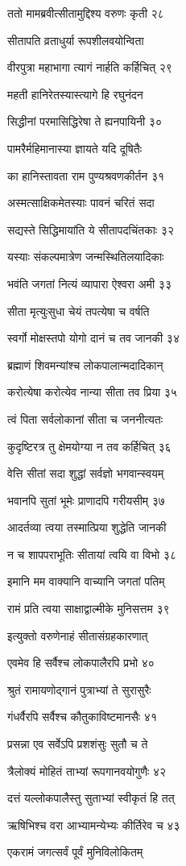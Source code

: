 ततो मामब्रवीत्सीतामुद्दिश्य वरुणः कृती २८

सीतापति व्रताधुर्या रूपशीलवयोन्विता

वीरपुत्रा महाभागा त्यागं नार्हति कर्हिचित् २९

महती हानिरेतस्यास्त्यागे हि रघुनंदन

सिद्धीनां परमासिद्धिरेषा ते ह्यनपायिनी ३०

पामरैर्महिमानास्या ज्ञायते यदि दूषितैः

का हानिस्तावता राम पुण्यश्रवणकीर्तन ३१

अस्मत्साक्षिकमेतस्याः पावनं चरितं सदा

सद्यस्ते सिद्धिमायांति ये सीतापदचिंतकाः ३२

यस्याः संकल्पमात्रेण जन्मस्थितिलयादिकाः

भवंति जगतां नित्यं व्यापारा ऐश्वरा अमी ३३

सीता मृत्युःसुधा चेयं तपत्येषा च वर्षति

स्वर्गो मोक्षस्तपो योगो दानं च तव जानकी ३४

ब्रह्माणं शिवमन्यांश्च लोकपालान्मदादिकान्

करोत्येषा करोत्येव नान्या सीता तव प्रिया ३५

त्वं पिता सर्वलोकानां सीता च जननीत्यतः

कुदृष्टिरत्र तु क्षेमयोग्या न तव कर्हिचित् ३६

वेत्ति सीतां सदा शुद्धां सर्वज्ञो भगवान्स्वयम्

भवानपि सुतां भूमेः प्राणादपि गरीयसीम् ३७

आदर्तव्या त्वया तस्मात्प्रिया शुद्धेति जानकी

न च शापपराभूतिः सीतायां त्वयि वा विभो ३८

इमानि मम वाक्यानि वाच्यानि जगतां पतिम्

रामं प्रति त्वया साक्षाद्वाल्मीके मुनिसत्तम ३९

इत्युक्तो वरुणेनाहं सीतासंग्रहकारणात्

एवमेव हि सर्वैश्च लोकपालैरपि प्रभो ४०

श्रुतं रामायणोद्गानं पुत्राभ्यां ते सुरासुरैः

गंधर्वैरपि सर्वैश्च कौतुकाविष्टमानसैः ४१

प्रसन्ना एव सर्वेऽपि प्रशशंसुः सुतौ च ते

त्रैलोक्यं मोहितं ताभ्यां रूपगानवयोगुणैः ४२

दत्तं यल्लोकपालैस्तु सुताभ्यां स्वीकृतं हि तत्

ऋषिभिश्च वरा आभ्यामन्येभ्यः कीर्तिरेव च ४३

एकरामं जगत्सर्वं पूर्वं मुनिविलोकितम्

